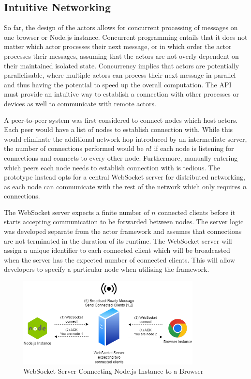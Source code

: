 \documentclass[oneside]{um-fict}
\begin{document}
\subsection{Intuitive Networking}
So far, the design of the actors allows for concurrent processing of messages on one browser or Node.js instance. Concurrent programming entails that it does not matter which actor processes their next message, or in which order the actor processes their messages, assuming that the actors are not overly dependent on their maintained isolated state. Concurrency implies that actors are potentially parallelisable, where multiple actors can process their next message in parallel and thus having the potential to speed up the overall computation. The API must provide an intuitive way to establish a connection with other processes or devices as well to communicate with remote actors.

A peer-to-peer system was first considered to connect nodes which host actors. Each peer would have a list of nodes to establish connection with. While this would eliminate the additional network hop introduced by an intermediate server, the number of connections performed would be $n!$ if each node is listening for connections and connects to every other node. Furthermore, manually entering which peers each node needs to establish connection with is tedious. The prototype instead opts for a central WebSocket server for distributed networking, as each node can communicate with the rest of the network which only requires $n$ connections.

The WebSocket server expects a finite number of $n$ connected clients before it starts accepting communication to be forwarded between nodes. The server logic was developed separate from the actor framework and assumes that connections are not terminated in the duration of its runtime. The WebSocket server will assign a unique identifier to each connected client which will be broadcasted when the server has the expected number of connected clients. This will allow developers to specify a particular node when utilising the framework.

\begin{figure}[H]
    \begin{centering}
        \includegraphics[width=350px]{resources/websocketconnection.png}
        \caption{WebSocket Server Connecting Node.js Instance to a Browser}
    \end{centering}
\end{figure}
 
\end{document}
